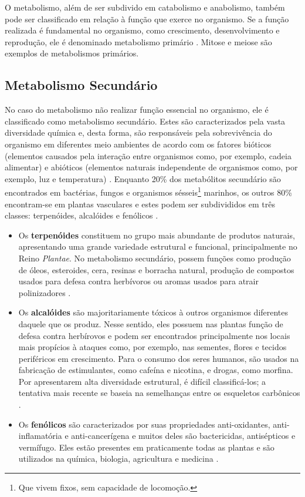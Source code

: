 \indent O metabolismo, além de ser subdivido em catabolismo e anabolismo, também pode ser classificado em relação à função que exerce no organismo. Se a função realizada é fundamental no organismo, como crescimento, desenvolvimento e reprodução, ele é denominado metabolismo primário \cite{Cap3schomburg}. Mitose e meiose são exemplos de metabolismos primários.  

\subsection{Metabolismo Secundário}

\indent No caso do metabolismo não realizar função essencial no organismo, ele é classificado como metabolismo secundário. Estes são caracterizados pela vasta diversidade química e, desta forma, são responsáveis pela sobrevivência do organismo em diferentes meio ambientes de acordo com os fatores bióticos (elementos causados pela interação entre organismos como, por exemplo, cadeia alimentar) e abióticos (elementos naturais independente de organismos como, por exemplo, luz e temperatura) \cite{Cap3schomburg}. Enquanto 20\% dos metabólitos secundário são encontrados em bactérias, fungos e organismos sésseis\footnote{Que vivem fixos, sem capacidade de locomoção.} marinhos, os outros 80\% encontram-se em plantas vasculares \cite{Cap3schomburg} e estes podem ser subdivididos em três classes: terpenóides, alcalóides e fenólicos \cite{kabera14}.
\begin{itemize}
\item Os \textbf{terpenóides} constituem no grupo mais abundante de produtos naturais, apresentando uma grande variedade estrutural e funcional, principalmente no Reino \textit{Plantae}. No metabolismo secundário, possem funções como produção de óleos, esteroides, cera, resinas e borracha natural, produção de compostos usados para defesa contra herbívoros ou aromas usados para atrair polinizadores \cite{Cap3schomburg}.

\item Os \textbf{alcalóides} são majoritariamente tóxicos à outros organismos diferentes daquele que os produz. Nesse sentido, eles possuem nas plantas função de defesa contra herbírovos e podem ser encontrados principalmente nos locais mais propícios à ataques como, por exemplo, nas sementes, flores e tecidos periféricos em crescimento. Para o consumo dos seres humanos, são usados na fabricação de estimulantes, como cafeína e nicotina, e drogas, como morfina\cite{Cap3schomburg}. Por apresentarem alta diversidade estrutural, é difícil classificá-los; a tentativa mais recente se baseia na semelhanças entre os esqueletos carbônicos \cite{kabera14}.

\item Os \textbf{fenólicos} são caracterizados por suas propriedades anti-oxidantes, anti-inflamatória e anti-cancerígena e muitos deles são bactericidas, antisépticos e vermífugo. Eles estão presentes em praticamente todas as plantas e são utilizados na química, biologia, agricultura e medicina \cite{kabera14}.
\end{itemize}


